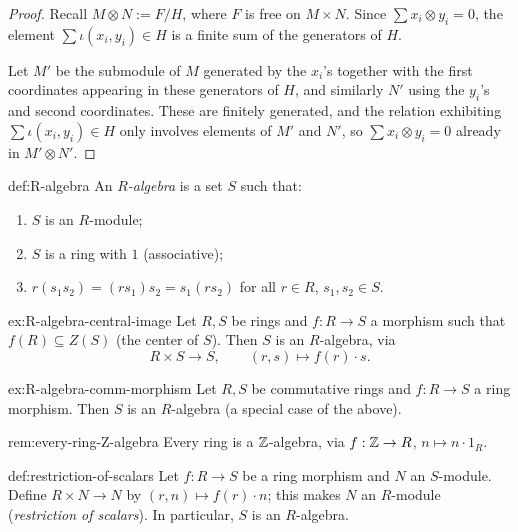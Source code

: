 \begin{proof}
Recall $M\otimes N := F/H$, where $F$ is free on $M\times N$. Since $\sum x_i\otimes y_i = 0$, the element $\sum \iota(x_i,y_i) \in H$ is a finite sum of the generators of $H$.

Let $M'$ be the submodule of $M$ generated by the $x_i$'s together with the first coordinates appearing in these generators of $H$, and similarly $N'$ using the $y_i$'s and second coordinates. These are finitely generated, and the relation exhibiting $\sum \iota(x_i,y_i) \in H$ only involves elements of $M'$ and $N'$, so $\sum x_i \otimes y_i = 0$ already in $M'\otimes N'$.
\end{proof}

\begin{definition}{}{def:R-algebra}
An \emph{$R$-algebra} is a set $S$ such that:
\begin{enumerate}[label=(\arabic*)]
    \item $S$ is an $R$-module;
    \item $S$ is a ring with $1$ (associative);
    \item $r(s_1s_2) = (rs_1)s_2 = s_1(rs_2)$ for all $r\in R$, $s_1,s_2\in S$.
\end{enumerate}
\end{definition}

\begin{example}{}{ex:R-algebra-central-image}
Let $R,S$ be rings and $f: R\to S$ a morphism such that $f(R) \subseteq Z(S)$ (the center of $S$). Then $S$ is an $R$-algebra, via
\[
R\times S \to S, \qquad (r,s) \mapsto f(r)\cdot s.
\]
\end{example}

\begin{example}{}{ex:R-algebra-comm-morphism}
Let $R,S$ be commutative rings and $f: R\to S$ a ring morphism. Then $S$ is an $R$-algebra (a special case of the above).
\end{example}

\begin{remark}{}{rem:every-ring-Z-algebra}
Every ring is a $\mathbb{Z}$-algebra, via $f: \mathbb{Z} \to R$, $n\mapsto n\cdot 1_R$.
\end{remark}

\begin{definition}{}{def:restriction-of-scalars}
Let $f: R\to S$ be a ring morphism and $N$ an $S$-module. Define $R\times N \to N$ by $(r,n)\mapsto f(r)\cdot n$; this makes $N$ an $R$-module (\emph{restriction of scalars}). In particular, $S$ is an $R$-algebra.
\end{definition}

